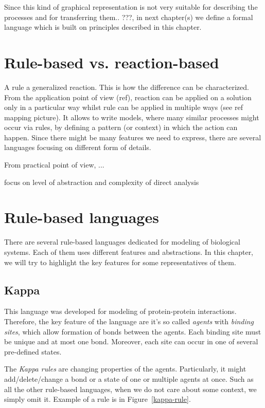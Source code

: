 \documentclass[12pt]{fithesis2}
\begin{document}
Since this kind of graphical representation is not very suitable for describing the processes and for transferring them.. ???, in next chapter(s) we define a formal language which is built on principles described in this chapter.

\section{Rule-based vs. reaction-based}

A rule a generalized reaction. This is how the difference can be characterized. From the application point of view (ref), reaction can be applied on a solution only in a particular way whilst rule can be applied in multiple ways (see ref mapping picture). It allows to write models, where many similar processes might occur via rules, by defining a pattern (or context) in which the action can happen. Since there might be many features we need to express, there are several languages focusing on different form of details.  

From practical point of view, ...

focus on level of abstraction and complexity of direct analysis

\section{Rule-based languages}

There are several rule-based languages dedicated for modeling of biological systems. Each of them uses different features and abstractions. In this chapter, we will try to highlight the key features for some representatives of them.

\subsection{Kappa}
\label{kappa}

This language was developed for modeling of protein-protein interactions. Therefore, the key feature of the language are it's so called \textit{agents} with \textit{binding sites}, which allow formation of bonds between the agents. Each binding site must be unique and at most one bond. Moreover, each site can occur in one of several pre-defined states.

The \textit{Kappa rules} are changing properties of the agents. Particularly, it might add/delete/change a bond or a state of one or multiple agents at once. Such as all the other rule-based languages, when we do not care about some context, we simply omit it. Example of a rule is in Figure~\ref{kappa-rule}.
\end{document}
